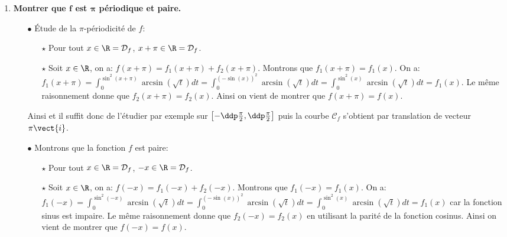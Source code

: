 \documentclass[a4paper, 11pt,reqno]{article}
\begin{document}
\begin{correction}
\begin{enumerate}
\begin{itemize}
\begin{itemize}
				            \item[$\star$] Pour tout $x\in\R$, on a: $f(x)=G_1(\sin^2{(x)})-G_1(0)+G_2(\cos^2{(x)})-G_2(0)$.
				            \item[$\star$] Ainsi  comme compos\'ees et sommes de fonctions de classe $C^1$.
			            \end{itemize}
		      \end{itemize}
		\item \textbf{Montrer que $\mathbf{f}$ est $\mathbf{\pi}$ p\'eriodique et paire.}
		      \begin{itemize}
			      \item[$\bullet$] \'Etude de la $\pi$-p\'eriodicit\'e de $f$:
			            \begin{itemize}
				            \item[$\star$] Pour tout $x\in\R=\mathcal{D}_f$, $x+\pi\in\R=\mathcal{D}_f$.
				            \item[$\star$] Soit $x\in\R$, on a: $f(x+\pi)=f_1(x+\pi)+f_2(x+\pi)$. Montrons que $f_1(x+\pi)=f_1(x)$. On a: $f_1(x+\pi)=\int_0^{\sin^2{(x+\pi)}} \arcsin{(\sqrt{t})}dt= \int_0^{(-\sin{(x)})^2} \arcsin{(\sqrt{t})}dt =\int_0^{\sin^2{(x)}} \arcsin{(\sqrt{t})}dt=f_1(x)$. Le m\^{e}me raisonnement donne que $f_2(x+\pi)=f_2(x)$. Ainsi on vient de montrer que $f(x+\pi)=f(x)$.
			            \end{itemize}
			            Ainsi  et il suffit donc de l'\'etudier par exemple sur $\left\lbrack -\ddp\frac{\pi}{2},\ddp\frac{\pi}{2}\right\rbrack$ puis la courbe $\mathcal{C}_f$ s'obtient par translation de vecteur $\pi\vect{i}$.
			      \item[$\bullet$] Montrons que la fonction $f$ est paire:
			            \begin{itemize}
				            \item[$\star$] Pour tout $x\in\R=\mathcal{D}_f$, $-x\in\R=\mathcal{D}_f$.
				            \item[$\star$] Soit $x\in\R$, on a: $f(-x)=f_1(-x)+f_2(-x)$. Montrons que $f_1(-x)=f_1(x)$. On a: $f_1(-x)=\int_0^{\sin^2{(-x)}} \arcsin{(\sqrt{t})}dt= \int_0^{(-\sin{(x)})^2} \arcsin{(\sqrt{t})}dt =\int_0^{\sin^2{(x)}} \arcsin{(\sqrt{t})}dt=f_1(x)$ car la fonction sinus est impaire. Le m\^{e}me raisonnement donne que $f_2(-x)=f_2(x)$ en utilisant la parit\'e de la fonction cosinus. Ainsi on vient de montrer que $f(-x)=f(x)$.
			            \end{itemize}

\end{itemize}
\end{enumerate}
\end{correction}
\end{document}
